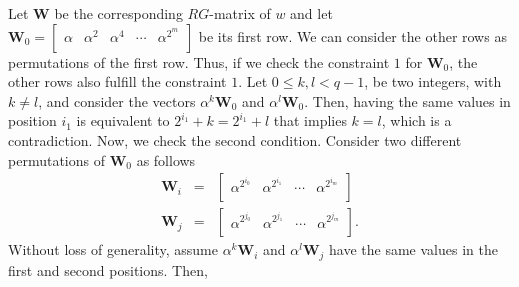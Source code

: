 \documentclass[journal,draftclsnofoot,onecolumn,12pt,twoside]{IEEEtran}
\begin{document}
\begin{IEEEproof}
Let $\mathbf{W}$ be the corresponding $RG$-matrix of $w$ and let $\mathbf{W}_0=\left[
                                                         \begin{array}{ccccc}
                                                           \alpha & \alpha^2 & \alpha^{4} & \cdots & \alpha^{2^m} \\
                                                         \end{array}
                                                       \right]$
be its first row. We can consider the other rows as permutations of the first row. Thus, if we check the constraint $1$ for $\mathbf{W}_0$, the other rows also fulfill the constraint $1$. Let $0\leq k,l<q-1$,  be two integers, with $k\neq l$, and consider the vectors $\alpha^k \mathbf{W}_0$ and $\alpha^l \mathbf{W}_0$. Then, having the same values in position $i_1$ is equivalent to $2^{i_1}+k=2^{i_1}+l$ that implies $k=l$, which is a contradiction. Now, we check the second condition. Consider two different permutations of $\mathbf{W}_0$ as follows
                                                       \begin{eqnarray*}
                                                         \mathbf{W}_i &=& \left[
                                                         \begin{array}{ccccc}
                                                           \alpha^{2^{i_0}} & \alpha^{2^{i_1}}  & \cdots & \alpha^{2^{i_m}} \\
                                                         \end{array}
                                                       \right]  \\
                                                        \mathbf{W}_j &=& \left[
                                                         \begin{array}{ccccc}
                                                           \alpha^{2^{j_0}} & \alpha^{2^{j_1}}  & \cdots & \alpha^{2^{j_m}}\\
                                                         \end{array}
                                                       \right].
                                                       \end{eqnarray*}
Without loss of generality, assume $\alpha^k \mathbf{W}_i$ and $\alpha^l \mathbf{W}_j$ have the same values in the first and second positions. Then,

\end{IEEEproof}
\end{document}

